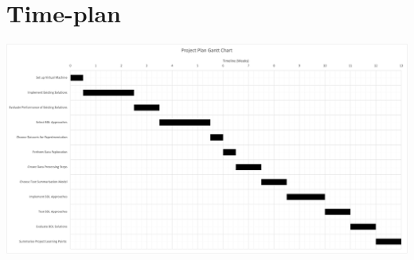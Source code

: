 \documentclass[ %
                    author={James Stephenson},
                supervisor={Dr. Edwin Simpson},
                    degree={MSc},
                     title={PROJECT PLAN},
                  subtitle={ Bayesian Deep Learning For Extractive Test Summarisation},
                      type={},
                      year={2022}]{../additions/dissertation}
\begin{document}
	
	
	
	\backmatter
	
	
	
	
	
	\appendix
	
	\chapter{Time-plan}
		\label{appx:timeplan}
		
		\begin{center}
			\includegraphics[width=\textwidth,height=\textheight,keepaspectratio]{Gantt.png}
		\end{center}
		
\end{document}
